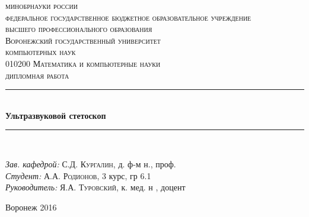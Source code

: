 \begin{titlepage}

\newcommand{\HRule}{\rule{\linewidth}{0.5mm}} %

\center %
 
\textsc {
\footnotesize{
минобрнауки россии\\
федеральное государственное бюджетное образовательное учреждение\\
высшего профессионального образования}\\
\large{Воронежский государственный университет}
}\\[1.0cm] %


\textsc{ компьютерных наук}\\ %
\textsc{\footnotesize010200 Математика и компьютерные науки}\\[1.0cm] 
\textsc{\Large дипломная работа}\\[0.5cm] %



\HRule \\[0.4cm]
{ \huge \bfseries Ультразвуковой стетоскоп}\\[0.4cm] %
\HRule \\[1.5cm]
 


\begin{flushleft} \large
\emph{Зав. кафедрой:} С.Д. \textsc{Кургалин}, д. ф-м н., проф.\\
\emph{Студент:} А.А. \textsc{Родионов}, 3 курс, гр 6.1 \\ %
\emph{Руководитель:} Я.А. \textsc{Туровский}, к. мед. н , доцент %
\end{flushleft}



\vfill %
\begin{center}
Воронеж 2016
\end{center}
\end{titlepage}

